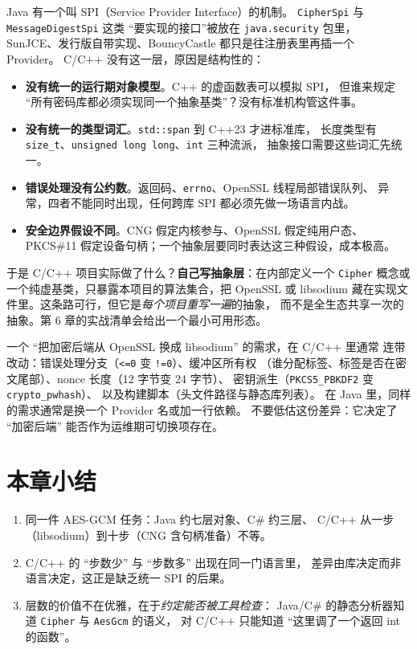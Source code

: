 \documentclass[12pt,a4paper,fontset=fandol]{ctexbook}
\newcommand{\cpp}[1]{C++#1}
\newcommand{\Tp}[1]{\texttt{#1}}
\newcommand{\CSharp}{C\#}
\newcommand{\CppJava}{C/C++}
\begin{document}
Java 有一个叫 SPI（Service Provider Interface）的机制。
\Tp{CipherSpi} 与 \Tp{MessageDigest\allowbreak Spi} 这类
``要实现的接口''被放在 \Tp{java.security} 包里，
SunJCE、发行版自带实现、BouncyCastle 都只是往注册表里再插一个 Provider。
\CppJava{} 没有这一层，原因是结构性的：

\begin{itemize}
  \item \textbf{没有统一的运行期对象模型}。C++ 的虚函数表可以模拟 SPI，
        但谁来规定 ``所有密码库都必须实现同一个抽象基类''？没有标准机构管这件事。
  \item \textbf{没有统一的类型词汇}。\Tp{std::span} 到 \cpp{23} 才进标准库，
        长度类型有 \Tp{size\_t}、\Tp{unsigned long long}、\Tp{int} 三种流派，
        抽象接口需要这些词汇先统一。
  \item \textbf{错误处理没有公约数}。返回码、\Tp{errno}、OpenSSL 线程局部错误队列、
        异常，四者不能同时出现，任何跨库 SPI 都必须先做一场语言内战。
  \item \textbf{安全边界假设不同}。CNG 假定内核参与、OpenSSL 假定纯用户态、
        PKCS\#11 假定设备句柄；一个抽象层要同时表达这三种假设，成本极高。
\end{itemize}

于是 \CppJava{} 项目实际做了什么？\textbf{自己写抽象层}：在内部定义一个
\Tp{Cipher} 概念或一个纯虚基类，只暴露本项目的算法集合，把 OpenSSL 或
libsodium 藏在实现文件里。这条路可行，但它是\emph{每个项目重写一遍}的抽象，
而不是全生态共享一次的抽象。第 6 章的实战清单会给出一个最小可用形态。

\begin{warning}[title=换库等于换 API 的真实成本]
一个 ``把加密后端从 OpenSSL 换成 libsodium'' 的需求，在 \CppJava{} 里通常
连带改动：错误处理分支（\texttt{<=0} 变 \texttt{!=0}）、缓冲区所有权
（谁分配标签、标签是否在密文尾部）、nonce 长度（12 字节变 24 字节）、
密钥派生（\Tp{PKCS5\_PBKDF2} 变 \Tp{crypto\_pwhash}）、
以及构建脚本（头文件路径与静态库列表）。
在 Java 里，同样的需求通常是换一个 Provider 名或加一行依赖。
不要低估这份差异：它决定了 ``加密后端'' 能否作为运维期可切换项存在。
\end{warning}

\section{本章小结}

\begin{enumerate}
  \item 同一件 AES-GCM 任务：Java 约七层对象、\CSharp{} 约三层、
        \CppJava{} 从一步（libsodium）到十步（CNG 含句柄准备）不等。
  \item \CppJava{} 的 ``步数少'' 与 ``步数多'' 出现在同一门语言里，
        差异由库决定而非语言决定，这正是缺乏统一 SPI 的后果。
  \item 层数的价值不在优雅，在于\emph{约定能否被工具检查}：
        Java/\allowbreak{}\CSharp{} 的静态分析器知道 \Tp{Cipher} 与 \Tp{AesGcm} 的语义，
        对 \CppJava{} 只能知道 ``这里调了一个返回 int 的函数''。
\end{enumerate}
\end{document}
